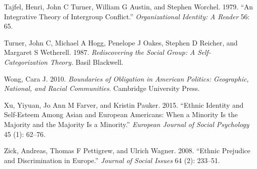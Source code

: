 \documentclass[a4paper]{cupjournal}
\newenvironment{CSLReferences}%
  {}%
  {\par}
\begin{document}
\begin{CSLReferences}{1}{0}
\leavevmode{}%
Tajfel, Henri, John C Turner, William G Austin, and Stephen Worchel. 1979. {``An Integrative Theory of Intergroup Conflict.''} \emph{Organizational Identity: A Reader} 56: 65.

\leavevmode{}%
Turner, John C, Michael A Hogg, Penelope J Oakes, Stephen D Reicher, and Margaret S Wetherell. 1987. \emph{Rediscovering the Social Group: {A} Self-Categorization Theory.} {Basil Blackwell}.

\leavevmode{}%
Wong, Cara J. 2010. \emph{Boundaries of Obligation in {American} Politics: {Geographic}, National, and Racial Communities}. {Cambridge University Press}.

\leavevmode{}%
Xu, Yiyuan, Jo Ann M Farver, and Kristin Pauker. 2015. {``Ethnic Identity and Self-Esteem Among {Asian} and {European Americans}: {When} a Minority Is the Majority and the Majority Is a Minority.''} \emph{European Journal of Social Psychology} 45 (1): 62--76.

\leavevmode{}%
Zick, Andreas, Thomas F Pettigrew, and Ulrich Wagner. 2008. {``Ethnic Prejudice and Discrimination in Europe.''} \emph{Journal of Social Issues} 64 (2): 233--51.

\end{CSLReferences}

\newpage
\singlespacing 
\end{document}
